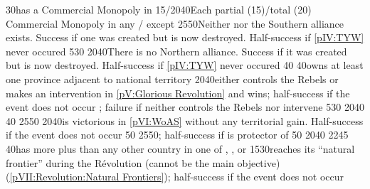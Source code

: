 %
%
%
{}{30}{\paysmajeurFrance has a Commercial Monopoly in }%
%
%
%
{15/20}{40}{Each partial (15)/total (20) Commercial Monopoly in any \STZ/\CTZ
  except }%
%
%
%
{25}{50}{Neither \GE nor the Southern \HRE alliance exists. Success if one was
  created but is now destroyed. Half-success if \ref{pIV:TYW} never occured}%
%
%
{5}{30}{\EU@objEachCOL}%
%
%
{20}{40}{There is no Northern \HRE alliance. Success if it was created but is
  now destroyed. Half-success if \ref{pIV:TYW} never occured}%
%
%
%
{}{40}{}%
%
%
{}{40}{\paysmajeurFrance owns at least one province adjacent to
  \paysmajeurHollande national territory}%
%
%
{20}{40}{\paysmajeurFrance either controls the Rebels or makes an intervention
  in \ref{pV:Glorious Revolution} and wins; half-success if the event does not
  occur ; failure if \paysmajeurFrance neither controls the Rebels nor
  intervene}%
%
%
{5}{30}{}%
%
%
{20}{40}{}%
%
%
%
{}{40}{}%
%
%
{25}{50}{\EU@objWoSS}%
%
%
{20}{40}{\paysmajeurFrance is victorious in \ref{pVI:WoAS} without any
  territorial gain. Half-success if the event does not occur}%
%
%
{}{50}{}%
%
%
{25}{50}{\EU@objPOLVictory; half-success if \paysmajeurSuede is protector of
  \paysPologne}%
%
%
%
{}{50}{}%
%
%
{20}{40}{\EU@objEachCC}%
%
%
{22}{45}{\EU@objIndependanceWars}%
%
%
{}{40}{\paysmajeurFrance has more \TP plus \COL than any other country in
  one of , , or
  }%
%
%
%
{15}{30}{\paysmajeurFrance reaches its ``natural frontier'' during the
  Révolution (cannot be the main objective) (\ref{pVII:Revolution:Natural
    Frontiers}); half-success if the event does not occur}%
